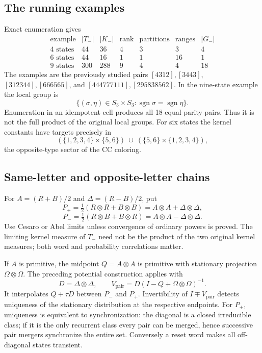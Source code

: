 \subsection{The running examples}
Exact enumeration gives
\[
\begin{array}{c|r|r|r|r|r|r}
\text{example}&|T_-|&|K_-|&\text{rank}&\text{partitions}&\text{ranges}&|G_-|\\
\hline
4\text{ states}&44&36&4&3&3&4\\
6\text{ states}&44&16&1&1&16&1\\
9\text{ states}&300&288&9&4&4&18
\end{array}
\]
The examples are the previously studied pairs $[4312],[3443]$,
$[312344],[666565]$, and $[444777111],[295838562]$.
In the nine-state example the local group is
\[
 \{(\sigma,\eta)\in S_3\times S_3:
       \operatorname{sgn}\sigma=\operatorname{sgn}\eta\}.
\]
Enumeration in an idempotent cell produces all 18 equal-parity pairs.
Thus it is not the full product of the original local groups.
For six states the kernel constants have targets precisely in
\[
 (\{1,2,3,4\}\times\{5,6\})\ \cup\
 (\{5,6\}\times\{1,2,3,4\}),
\]
the opposite-type sector of the CC coloring.

\subsection{Same-letter and opposite-letter chains}
For $A=(R+B)/2$ and $\Delta=(R-B)/2$, put
\[
 P_+=\tfrac12(R\otimes R+B\otimes B)
     =A\otimes A+\Delta\otimes\Delta,
\]
\[
 P_-=\tfrac12(R\otimes B+B\otimes R)
     =A\otimes A-\Delta\otimes\Delta.
\]
Use Cesaro or Abel limits unless convergence of ordinary powers is
proved. The limiting kernel measure of $T_-$ need not be the product
of the two original kernel measures; both word and probability correlations matter.

If $A$ is primitive, the midpoint $Q=A\otimes A$ is primitive with
stationary projection $\Omega\otimes\Omega$. The preceding potential
construction applies with
\[
 D=\Delta\otimes\Delta,\qquad
 V_{\mathrm{pair}}=D(I-Q+\Omega\otimes\Omega)^{-1}.
\]
It interpolates $Q+\tau D$ between $P_-$ and $P_+$.
Invertibility of $I\mp V_{\mathrm{pair}}$ detects uniqueness of the
stationary distribution at the respective endpoints. For $P_+$,
uniqueness is equivalent to synchronization: the diagonal is a closed
irreducible class; if it is the only recurrent class every pair can be
merged, hence successive pair mergers synchronize the entire set.
Conversely a reset word makes all off-diagonal states transient.

